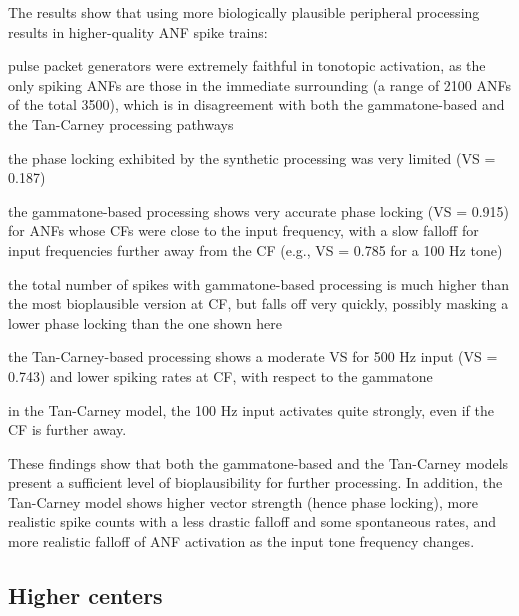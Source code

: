 \documentclass[11pt,a4paper,twocolumn]{article}
\begin{document}
The results show that using more biologically plausible peripheral processing results in higher-quality ANF spike trains:
\begin{inlinelist}
    \item pulse packet generators were extremely faithful in tonotopic activation, as the only spiking ANFs are those in the immediate surrounding (a range of 2100 ANFs of the total 3500), which is in disagreement with both the gammatone-based and the Tan-Carney processing pathways
    \item the phase locking exhibited by the synthetic processing was very limited (VS = 0.187)
    \item\label{vs:gamm} the gammatone-based processing shows very accurate phase locking (VS = 0.915) for ANFs whose CFs were close to the input frequency, with a slow falloff for input frequencies further away from the CF (e.g., VS = 0.785 for a 100 Hz tone)
    \item the total number of spikes with gammatone-based processing is much higher than the most bioplausible version at CF, but falls off very quickly, possibly masking a lower phase locking than the one shown here
    \item the Tan-Carney-based processing shows a moderate VS for 500 Hz input (VS = 0.743) and lower spiking rates at CF, with respect to the gammatone 
    \item\label{vs:tclowfreq} in the Tan-Carney model, the 100 Hz input activates quite strongly, even if the CF is further away.
\end{inlinelist}
These findings show that both the gammatone-based and the Tan-Carney models present a sufficient level of bioplausibility for further processing. In addition, the Tan-Carney model shows higher vector strength (hence phase locking), more realistic spike counts with a less drastic falloff and some spontaneous rates, and more realistic falloff of ANF activation as the input tone frequency changes.


\subsection{Higher centers}
\end{document}
